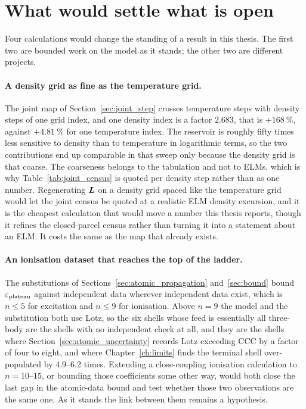 \section{What would settle what is open}
\label{sec:further_work}

Four calculations would change the standing of a result in this thesis. The
first two are bounded work on the model as it stands; the other two are
different projects.

\paragraph{A density grid as fine as the temperature grid.} The joint map of
Section~\ref{sec:joint_step} crosses temperature steps with density steps of one
grid index, and one density index is a factor $2.683$, that is
$+\SI{168}{\percent}$, against $+\SI{4.81}{\percent}$ for one temperature index.
The reservoir is roughly fifty times less sensitive to density than to
temperature in logarithmic terms, so the two contributions end up comparable in
that sweep only because the density grid is that coarse. The coarseness belongs
to the tabulation and not to ELMs, which is why
Table~\ref{tab:joint_census} is quoted per density step rather than as one
number. Regenerating $\bm{L}$ on a density grid spaced like the temperature grid
would let the joint census be quoted at a realistic ELM density excursion, and
it is the cheapest calculation that would move a number this thesis reports,
though it refines the closed-parcel census rather than turning it into a
statement about an ELM. It costs the same as the map that already exists.

\paragraph{An ionisation dataset that reaches the top of the ladder.} The
substitutions of Sections~\ref{sec:atomic_propagation} and~\ref{sec:bound}
bound $\varepsilon_{\mathrm{plateau}}$ against independent data wherever independent data exist,
which is $n\le5$ for excitation and $n\le9$ for ionisation. Above $n=9$ the
model and the substitution both use Lotz, so the six shells whose feed is
essentially all three-body are the shells with no independent check at all,
and they are the shells where Section~\ref{sec:atomic_uncertainty} records Lotz
exceeding CCC by a factor of four to eight, and where
Chapter~\ref{ch:limits} finds the terminal shell over-populated by
4.9--6.2 times. Extending a close-coupling ionisation calculation to
$n=10$--$15$, or bounding those coefficients some other way, would both close
the last gap in the atomic-data bound and test whether those two observations
are the same one. As it stands the link between them remains a hypothesis.

